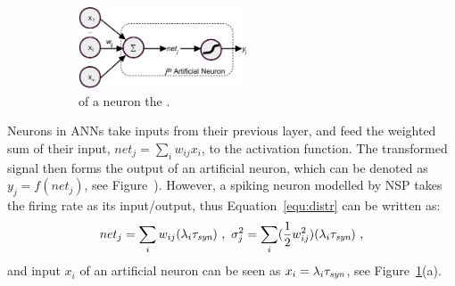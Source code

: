 \begin{figure}[tbh!]
\begin{subfigure}[t]{\textwidth}
		\end{subfigure}\DIFaddbeginFL \\\bigskip
		\begin{subfigure}[t]{\textwidth}
			\centering
			\includegraphics[width=0.55\textwidth]{pics_iconip/neuron.pdf}
			\DIFaddendFL \caption{\DIFdelbeginFL {}\DIFdelendFL \DIFaddbeginFL {}\DIFaddendFL of \DIFaddbeginFL {}\DIFaddendFL a \DIFdelbeginFL {}\DIFdelendFL \DIFaddbeginFL {}\DIFaddendFL neuron \DIFdelbeginFL {}\DIFdelendFL \DIFaddbeginFL {}\DIFaddendFL the \DIFdelbeginFL {}\DIFdelendFL \DIFaddbeginFL {}\DIFaddendFL .}
		\DIFaddbeginFL \end{subfigure}
		\caption{}
		\DIFaddendFL \label{Fig:tneuron}
	\end{figure}

	Neurons in ANNs take inputs from their previous layer, and feed the weighted sum of their input, $net_j = \sum_i w_{ij}x_i$, to the activation function.
	The transformed signal then forms the output of an artificial neuron, which can be denoted as $y_j=f(net_j)$, see Figure~\DIFdelbegin {}\DIFdelend \DIFaddbegin {}\DIFaddend ).
	However, a spiking neuron modelled by NSP takes the firing rate as its input/output, thus Equation~\ref{equ:distr} can be written as:
	\begin{equation}
	net_j = \sum_i w_{ij}(\lambda_{i}\tau_{\textit{\textrm{syn}}})~,
	~\sigma^2_j= \sum_i (\frac{1}{2} w_{ij}^2)(\lambda_{i}\tau_{\textit{\textrm{syn}}})~, 
	\label{equ:mi_input}
	\end{equation}
	and input $ x_i $ of an artificial neuron can be seen as $x_i=\lambda_{i}\tau_{\textit{\textrm{syn}}}$, see Figure~\ref{Fig:tneuron}(a).

